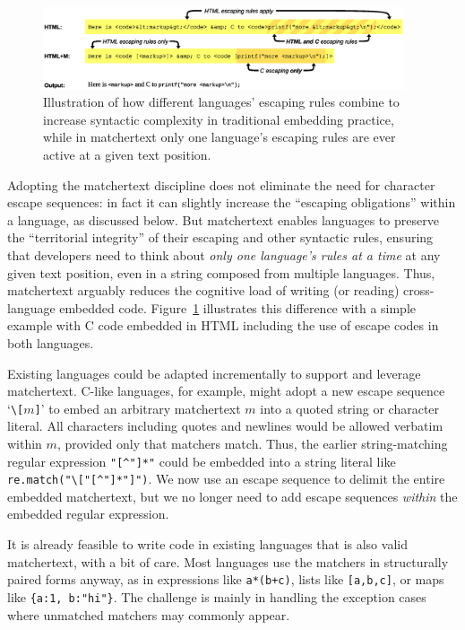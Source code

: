 \begin{figure}[t]
\begin{center}
\includegraphics[width=0.95\textwidth]{fig/territorial-integrity.eps}
\end{center}
\caption{Illustration of how different languages' escaping rules
	combine to increase syntactic complexity
	in traditional embedding practice,
	while in matchertext only one language's escaping rules
	are ever active at a given text position.}
\label{fig:territorial-integrity}
\end{figure}

Adopting the matchertext discipline
does not eliminate the need for character escape sequences:
in fact it can slightly increase the ``escaping obligations''
within a language, as discussed below.
But matchertext enables languages to preserve
the ``territorial integrity'' of their escaping and other syntactic rules,
ensuring that developers need to think about
\emph{only one language's rules at a time}
at any given text position,
even in a string composed from multiple languages.
Thus, matchertext arguably reduces the cognitive load
of writing (or reading) cross-language embedded code.
Figure~\ref{fig:territorial-integrity} illustrates this difference
with a simple example with C code embedded in HTML
including the use of escape codes in both languages.

Existing languages could be adapted incrementally
to support and leverage matchertext.
C-like languages, for example,
might adopt a new escape sequence `\verb|\[|$m$\verb|]|'
to embed an arbitrary matchertext $m$
into a quoted string or character literal.
All characters including quotes and newlines
would be allowed verbatim within $m$,
provided only that matchers match.
Thus,
the earlier string-matching regular expression
\verb|"[^"]*"|
could be embedded into a string literal
like \verb|re.match("\["[^"]*"]")|.
We now use an escape sequence
to delimit the entire embedded matchertext,
but we no longer need to add escape sequences
\emph{within} the embedded regular expression.

It is already feasible to write code in existing languages
that is also valid matchertext,
with a bit of care.
Most languages use the matchers in structurally paired forms anyway,
as in expressions like \verb|a*(b+c)|,
lists like \verb|[a,b,c]|,
or maps like \verb|{a:1, b:"hi"}|.
The challenge is mainly in handling the exception cases
where unmatched matchers may commonly appear.

